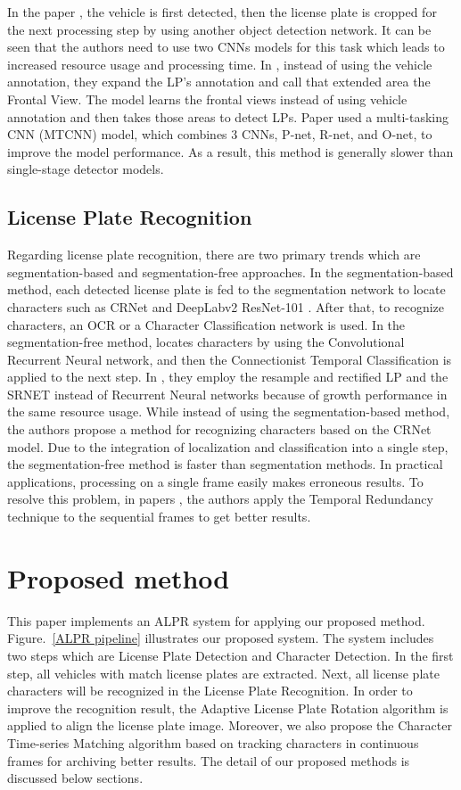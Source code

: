 \documentclass[conference]{IEEEtran}
\begin{document}
In the paper \cite{ufpr, layout}, the vehicle is first detected, then the license plate is cropped for the next processing step by using another object detection network. It can be seen that the authors need to use two CNNs models for this task which leads to increased resource usage and processing time. In \cite{brazilian}, instead of using the vehicle annotation, they expand the LP's annotation and call that extended area the Frontal View. The model learns the frontal views instead of using vehicle annotation and then takes those areas to detect LPs. Paper \cite{lite} used a multi-tasking CNN (MTCNN) model, which combines 3 CNNs, P-net, R-net, and O-net, to improve the model performance. As a result, this method is generally slower than single-stage detector models. 

\subsection{License Plate Recognition}
Regarding license plate recognition, there are two primary trends which are segmentation-based and segmentation-free approaches. In the segmentation-based method, each detected license plate is fed to the segmentation network to locate characters such as CRNet \cite{ufpr}  and DeepLabv2 ResNet-101 \cite{deeplab}. After that, to recognize characters, an OCR or a Character Classification network is used. In the segmentation-free method, \cite{lite} locates characters by using the Convolutional Recurrent Neural network, and then the Connectionist Temporal Classification is applied to the next step. In \cite{vertex}, they employ the resample and rectified LP and the SRNET instead of Recurrent Neural networks because of growth performance in the same resource usage. While instead of using the segmentation-based method, the authors \cite{layout} propose a method for recognizing characters based on the CRNet model. Due to the integration of localization and classification into a single step, the segmentation-free method is faster than segmentation methods. In practical applications, processing on a single frame easily makes erroneous results. To resolve this problem, in papers \cite{ufpr, layout}, the authors apply the Temporal Redundancy technique to the sequential frames to get better results. 

\section{Proposed method}
This paper implements an ALPR system for applying our proposed method. Figure.~\ref{ALPR pipeline} illustrates our proposed system. The system includes two steps which are License Plate Detection and Character Detection. In the first step, all vehicles with match license plates are extracted. Next, all license plate characters will be recognized in the License Plate Recognition. In order to improve the recognition result, the Adaptive License Plate Rotation algorithm is applied to align the license plate image. Moreover, we also propose the Character Time-series Matching algorithm based on tracking characters in continuous frames for archiving better results. The detail of our proposed methods is discussed below sections.
\end{document}

